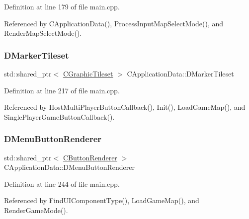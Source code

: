 Definition at line 179 of file main.\+cpp.



Referenced by C\+Application\+Data(), Process\+Input\+Map\+Select\+Mode(), and Render\+Map\+Select\+Mode().

\hypertarget{classCApplicationData_ae9f336696b810bff2353d731300ec9d7}{}\label{classCApplicationData_ae9f336696b810bff2353d731300ec9d7} 
\subsubsection{\texorpdfstring{D\+Marker\+Tileset}{DMarkerTileset}}
{\footnotesize\ttfamily std\+::shared\+\_\+ptr$<$ \hyperlink{classCGraphicTileset}{C\+Graphic\+Tileset} $>$ C\+Application\+Data\+::\+D\+Marker\+Tileset\hspace{0.3cm}{\ttfamily [protected]}}



Definition at line 217 of file main.\+cpp.



Referenced by Host\+Multi\+Player\+Button\+Callback(), Init(), Load\+Game\+Map(), and Single\+Player\+Game\+Button\+Callback().

\hypertarget{classCApplicationData_a2c9f10aa452454a016e0164f6ce777a6}{}\label{classCApplicationData_a2c9f10aa452454a016e0164f6ce777a6} 
\subsubsection{\texorpdfstring{D\+Menu\+Button\+Renderer}{DMenuButtonRenderer}}
{\footnotesize\ttfamily std\+::shared\+\_\+ptr$<$ \hyperlink{classCButtonRenderer}{C\+Button\+Renderer} $>$ C\+Application\+Data\+::\+D\+Menu\+Button\+Renderer\hspace{0.3cm}{\ttfamily [protected]}}



Definition at line 244 of file main.\+cpp.



Referenced by Find\+U\+I\+Component\+Type(), Load\+Game\+Map(), and Render\+Game\+Mode().

\hypertarget{classCApplicationData_a92e86e12efc0c3246550b3043b892bea}{}\label{classCApplicationData_a92e86e12efc0c3246550b3043b892bea} 
